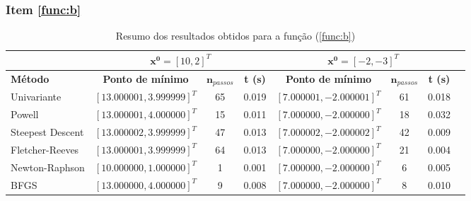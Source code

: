 \documentclass[10pt, a4paper]{article}
\begin{document}
\subsubsection{Item \ref{func:b}}

\begin{table}[htpb]
  \centering
  \begin{tabular}{|l|c|c|c|c|c|c|c|}
    \multicolumn{1}{c}{} %
    & 
    \multicolumn{3}{c}{$\mathbf{x^0} = [10, 2]^T$} \vline
    & 
    \multicolumn{3}{c}{$\mathbf{x^0} = [-2, -3]^T$} \\%
    \hline%
    \textbf{Método}
    &
    \textbf{Ponto de mínimo}
    & 
    $\mathbf{n}_{passos}$
    & 
    \textbf{t (s)}
    &
    \textbf{Ponto de mínimo}
    & 
    $\mathbf{n}_{passos}$
    & 
    \textbf{t (s)}
    \\
    Univariante        & $[13.000001, 3.999999]^T$ & 65 & 0.019 &  $[7.000001, -2.000001]^T$ &  61  & 0.018    \\
    Powell             & $[13.000001, 4.000000]^T$ & 15 & 0.011 &  $[7.000000, -2.000000]^T$ &  18  & 0.032    \\
    Steepest Descent   & $[13.000002, 3.999999]^T$ & 47 & 0.013 &  $[7.000002, -2.000002]^T$ &  42  & 0.009    \\
    Fletcher-Reeves    & $[13.000001, 3.999999]^T$ & 64 & 0.013 &  $[7.000000, -2.000000]^T$ &  21  & 0.004    \\
    Newton-Raphson     & $[10.000000, 1.000000]^T$ & 1  & 0.001 &  $[7.000000, -2.000000]^T$ &  6   & 0.005    \\
    BFGS               & $[13.000000, 4.000000]^T$ & 9  & 0.008 &  $[7.000000, -2.000000]^T$ &  8   & 0.010    \\
    \hline
  \end{tabular}
  \caption{Resumo dos resultados obtidos para a função (\ref{func:b})}
  \label{tab:q1b_results}
\end{table}
\end{document}
